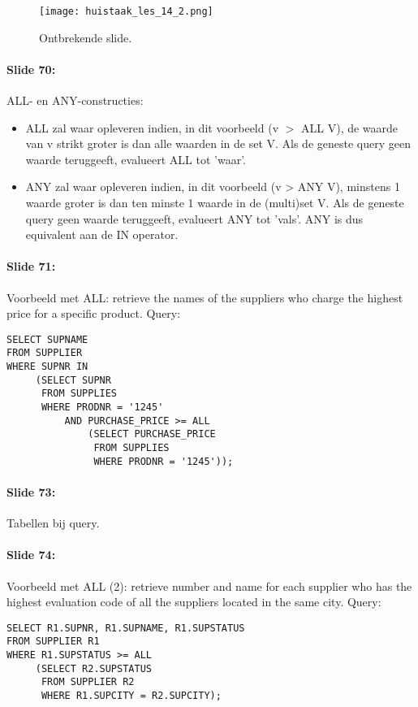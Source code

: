 \documentclass[10pt,a4paper]{report}
\begin{document}
\begin{figure}[ht!]
\centering
\texttt{[image: huistaak\_les\_14\_2.png]}
\caption{Ontbrekende slide. \label{huistaak_img2}}
\end{figure}

\paragraph{Slide 70:} ALL- en ANY-constructies: 
\begin{itemize}
\item ALL zal waar opleveren indien, in dit voorbeeld (v $>$ ALL V), de waarde van v strikt groter is dan alle waarden in de set V. Als de geneste query geen waarde teruggeeft, evalueert ALL tot 'waar'.
\item ANY zal waar opleveren indien, in dit voorbeeld (v > ANY V), minstens 1 waarde groter is dan ten minste 1 waarde in de (multi)set V. Als de geneste query geen waarde teruggeeft, evalueert ANY tot 'vals'. ANY is dus equivalent aan de IN operator.
\end{itemize}

\paragraph{Slide 71:}Voorbeeld met ALL: retrieve the names of the suppliers who charge the highest price for a specific product. Query:
\begin{verbatim}
SELECT SUPNAME
FROM SUPPLIER
WHERE SUPNR IN
     (SELECT SUPNR
      FROM SUPPLIES
      WHERE PRODNR = '1245'
          AND PURCHASE_PRICE >= ALL
              (SELECT PURCHASE_PRICE
               FROM SUPPLIES
               WHERE PRODNR = '1245'));
\end{verbatim}

\paragraph{Slide 73:}Tabellen bij query.

\paragraph{Slide 74:}Voorbeeld met ALL (2): retrieve number and name for each supplier who has the highest evaluation code of all the suppliers located in the same city. Query:
\begin{verbatim}
SELECT R1.SUPNR, R1.SUPNAME, R1.SUPSTATUS
FROM SUPPLIER R1
WHERE R1.SUPSTATUS >= ALL
     (SELECT R2.SUPSTATUS
      FROM SUPPLIER R2
      WHERE R1.SUPCITY = R2.SUPCITY);
\end{verbatim}
\end{document}
